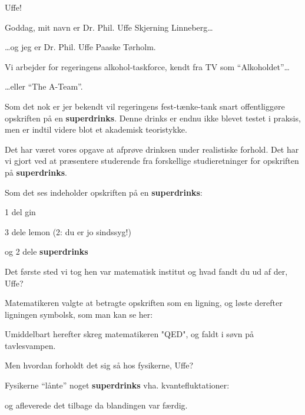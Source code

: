 \documentclass[a4paper,11pt]{article}
\newcommand{\sd}{\textbf{superdrinks}}
\begin{document}
\begin{sketch}

   Uffe! 

   Goddag, mit navn er Dr. Phil. Uffe Skjerning Linneberg\ldots

   \ldots{}og jeg er Dr. Phil. Uffe Paaske Tørholm.

   Vi arbejder for regeringens alkohol-taskforce, kendt fra TV
  som ``Alkoholdet''\ldots

   \ldots{}eller ``The A-Team''.


   Som det nok er jer bekendt vil regeringens fest-tænke-tank
  snart offentliggøre opskriften på en \sd. Denne drinks er endnu ikke
  blevet testet i praksis, men er indtil videre blot et akademisk
  teoristykke.

   Det har været vores opgave at afprøve drinksen under
  realistiske forhold. Det har vi gjort ved at præsentere studerende
  fra forskellige studieretninger for opskriften på \sd.

   Som det ses indeholder opskriften på en \sd:


   1 del gin

   3 dele lemon (2: du er jo sindssyg!)

   og 2 dele \sd

   Det første sted vi tog hen var matematisk institut og hvad
  fandt du ud af der, Uffe?

   Matematikeren valgte at betragte opskriften som en ligning, og løste
  derefter ligningen symbolsk, som man kan se her:


   Umiddelbart herefter skreg matematikeren "QED", og faldt i søvn på
  tavlesvampen.

   Men hvordan forholdt det sig så hos fysikerne, Uffe?

   Fysikerne ``lånte'' noget \sd{} vha. kvantefluktationer:


   og afleverede det tilbage da blandingen var færdig.


\end{sketch}
\end{document}

